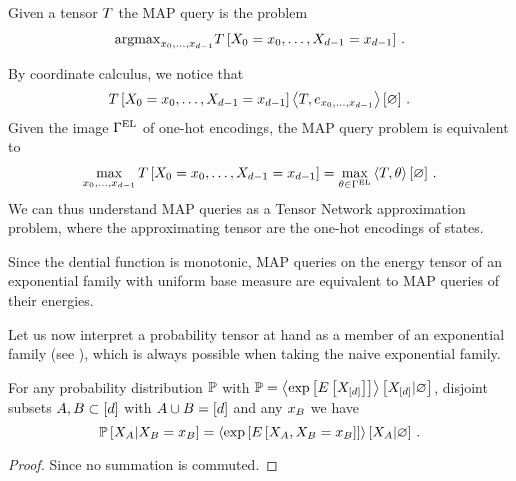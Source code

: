 \begin{definition}
	Given a tensor $T$ the MAP query is the problem 
	\begin{align}
		\mathrm{argmax}_{x_{0},\ldots,x_{d-1}} T\left[X_{0}=x_{0},\ldots,X_{d-1}=x_{d-1}\right] \, .
	\end{align}
\end{definition}


By coordinate calculus, we notice that
\begin{align}
	T\left[X_{0}=x_{0},\ldots,X_{d-1}=x_{d-1}\right] 
	\left\langle T, e_{x_{0},\ldots,x_{d-1}}\right\rangle \left[ \varnothing \right] \, .
\end{align}
Given the image $\Gamma^{\mathrm{EL}}$ of one-hot encodings, the MAP query problem is equivalent to 
\begin{align}
	\max_{x_{0},\ldots,x_{d-1}} T\left[X_{0}=x_{0},\ldots,X_{d-1}=x_{d-1}\right] 
	= \max_{\theta\in\Gamma^{\mathrm{EL}}} \left\langle T, \theta\right\rangle \left[ \varnothing \right] \, .
\end{align}
We can thus understand MAP queries as a Tensor Network approximation problem, where the approximating tensor are the one-hot encodings of states.

\begin{remark}
	Since the dential function is monotonic, MAP queries on the energy tensor of an exponential family with uniform base measure are equivalent to MAP queries of their energies.
\end{remark}



Let us now interpret a probability tensor at hand as a member of an exponential family (see ), which is always possible when taking the naive exponential family.

\begin{lemma}\label{lem:energyContractionQueries} %
	For any probability distribution $\mathbb{P}$ with $\mathbb{P}= \left\langle \mathrm{exp}\left[E\left[X_{[d]}\right]\right]\right\rangle \left[ X_{[d]} | \varnothing \right]$, disjoint subsets $A,B \subset [d]$ with $A\cup B=[d]$  and any $x_{B}$ we have
		\[ \mathbb{P}\left[X_{A}|X_{B}=x_{B}\right] 
			= \left\langle 
				\mathrm{exp}\left[E\left[X_{A},X_{B}=x_{B}\right]\right]
		\right\rangle \left[ X_{A} | \varnothing \right] \, .\]
\end{lemma}
\begin{proof}
	Since no summation is commuted.
\end{proof}

